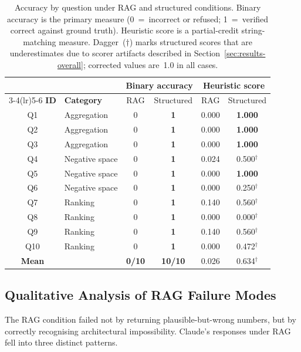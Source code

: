 \begin{table}[t]
\centering
\caption{Accuracy by question under RAG and structured conditions.
Binary accuracy is the primary measure (0~=~incorrect or refused;
1~=~verified correct against ground truth). Heuristic score is a
partial-credit string-matching measure. Dagger~($\dagger$) marks
structured scores that are underestimates due to scorer artifacts
described in Section~\ref{sec:results-overall}; corrected values
are~1.0 in all cases.}
\label{tab:accuracy}
\small
\begin{tabular}{clcccc}
\toprule
 & & \multicolumn{2}{c}{\textbf{Binary accuracy}} &
   \multicolumn{2}{c}{\textbf{Heuristic score}} \\
\cmidrule(lr){3-4}\cmidrule(lr){5-6}
\textbf{ID} & \textbf{Category} & RAG & Structured & RAG & Structured \\
\midrule
Q1  & Aggregation    & 0 & \textbf{1} & 0.000 & \textbf{1.000} \\
Q2  & Aggregation    & 0 & \textbf{1} & 0.000 & \textbf{1.000} \\
Q3  & Aggregation    & 0 & \textbf{1} & 0.000 & \textbf{1.000} \\
\midrule
Q4  & Negative space & 0 & \textbf{1} & 0.024 & 0.500$^\dagger$ \\
Q5  & Negative space & 0 & \textbf{1} & 0.000 & \textbf{1.000} \\
Q6  & Negative space & 0 & \textbf{1} & 0.000 & 0.250$^\dagger$ \\
\midrule
Q7  & Ranking        & 0 & \textbf{1} & 0.140 & 0.560$^\dagger$ \\
Q8  & Ranking        & 0 & \textbf{1} & 0.000 & 0.000$^\dagger$ \\
Q9  & Ranking        & 0 & \textbf{1} & 0.140 & 0.560$^\dagger$ \\
Q10 & Ranking        & 0 & \textbf{1} & 0.000 & 0.472$^\dagger$ \\
\midrule
\textbf{Mean} & & \textbf{0/10} & \textbf{10/10} & 0.026 & 0.634$^\dagger$ \\
\bottomrule
\end{tabular}
\end{table}

\subsection{Qualitative Analysis of RAG Failure Modes}
\label{sec:results-qualitative}

The RAG condition failed not by returning plausible-but-wrong numbers, but by
correctly recognising architectural impossibility. Claude's responses under RAG
fell into three distinct patterns.

